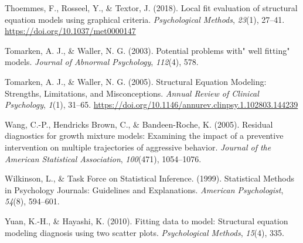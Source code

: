 \documentclass[
  english,
  doc]{apa6}
\newlength{\cslhangindent}
\newenvironment{cslreferences}%
  {\setlength{\parindent}{0pt}%
  \everypar{\setlength{\hangindent}{\cslhangindent}}\ignorespaces}%
  {\par}
\begin{document}
\begin{cslreferences}
\leavevmode\hypertarget{ref-Thoemmes2018}{}%
Thoemmes, F., Rosseel, Y., \& Textor, J. (2018). Local fit evaluation of structural equation models using graphical criteria. \emph{Psychological Methods}, \emph{23}(1), 27--41. \url{https://doi.org/10.1037/met0000147}

\leavevmode\hypertarget{ref-tomarken2003potential}{}%
Tomarken, A. J., \& Waller, N. G. (2003). Potential problems with" well fitting" models. \emph{Journal of Abnormal Psychology}, \emph{112}(4), 578.

\leavevmode\hypertarget{ref-Tomarken2005}{}%
Tomarken, A. J., \& Waller, N. G. (2005). Structural Equation Modeling: Strengths, Limitations, and Misconceptions. \emph{Annual Review of Clinical Psychology}, \emph{1}(1), 31--65. \url{https://doi.org/10.1146/annurev.clinpsy.1.102803.144239}

\leavevmode\hypertarget{ref-wang2005residual}{}%
Wang, C.-P., Hendricks Brown, C., \& Bandeen-Roche, K. (2005). Residual diagnostics for growth mixture models: Examining the impact of a preventive intervention on multiple trajectories of aggressive behavior. \emph{Journal of the American Statistical Association}, \emph{100}(471), 1054--1076.

\leavevmode\hypertarget{ref-Wilkinson1999a}{}%
Wilkinson, L., \& Task Force on Statistical Inference. (1999). Statistical Methods in Psychology Journals: Guidelines and Explanations. \emph{American Psychologist}, \emph{54}(8), 594--601.

\leavevmode\hypertarget{ref-yuan2010fitting}{}%
Yuan, K.-H., \& Hayashi, K. (2010). Fitting data to model: Structural equation modeling diagnosis using two scatter plots. \emph{Psychological Methods}, \emph{15}(4), 335.
\end{cslreferences}
\end{document}
